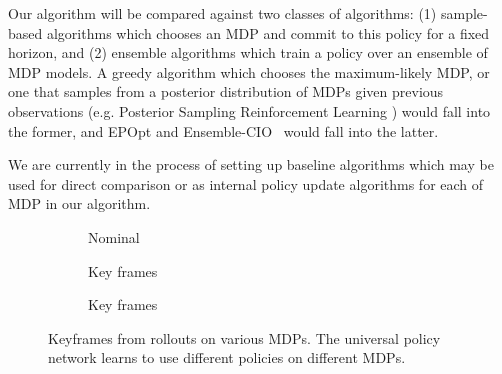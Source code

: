 \documentclass{article}
\begin{document}
Our algorithm will be compared against two classes of algorithms: (1) sample-based algorithms which chooses an MDP and commit to this policy for a fixed horizon, and (2) ensemble algorithms which train a policy over an ensemble of MDP models. A greedy algorithm which chooses the maximum-likely MDP, or one that samples from a posterior distribution of MDPs given previous observations (e.g. Posterior Sampling Reinforcement Learning \cite{psrl}) would fall into the former, and EPOpt\cite{rajeswaran2016epopt} and Ensemble-CIO~\cite{ensemble-cio} would fall into the latter.

We are currently in the process of setting up baseline algorithms which may be used for direct comparison or as internal policy update algorithms for each of MDP in our algorithm.

\newpage
\begin{figure}[t!]
\begin{centering}
\begin{subfigure}[b]{0.3\columnwidth}
\caption{Nominal}
\end{subfigure}
\begin{subfigure}[b]{0.3\columnwidth}
\caption{Key frames}
\end{subfigure}
\begin{subfigure}[b]{0.3\columnwidth}
\caption{Key frames}
\end{subfigure}
\end{centering}
\caption{Keyframes from rollouts on various MDPs. The universal policy network learns to use different policies on different MDPs.}
\end{figure}
\end{document}
